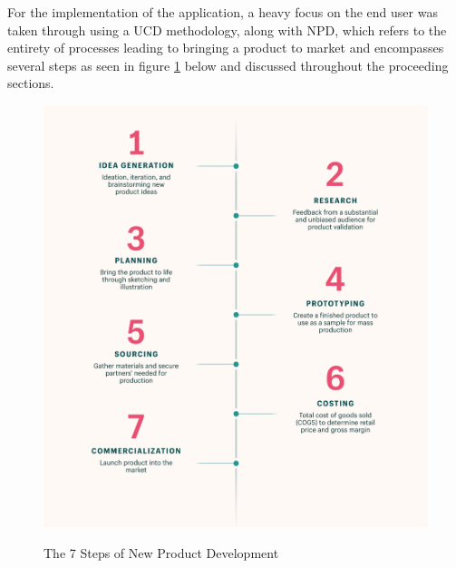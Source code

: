 \documentclass[12pt]{article}
\begin{document}
	For the implementation of the application, a heavy focus on the end user was taken through using a UCD methodology, along with NPD, which refers to the  entirety of processes leading to bringing a product to market and encompasses several steps as seen in figure \ref{fig:npd} below and discussed throughout the proceeding sections.
	\newline
	
	\begin{figure}[H]
		\centering
		\includegraphics[scale=0.15]{images/npd.png}
		\caption{The 7 Steps of New Product Development}
		\label{fig:npd} \cite{shopifyWhatProductDevelopment}
	\end{figure}
	
	
\end{document}
